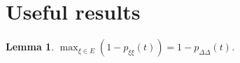 \documentclass{article}
\newtheorem{lemma}{Lemma}
\newcommand{\1}[1]{\mathbbm{1}_{#1}}
\begin{document}
\section*{Useful results}

\begin{lemma}\label{thm:maximum_pr}
$\max_{\xi\in E} (1 - p_{\xi\xi}(t)) = 1 - p_{\Delta\Delta}(t)$.
\end{lemma}
\end{document}
